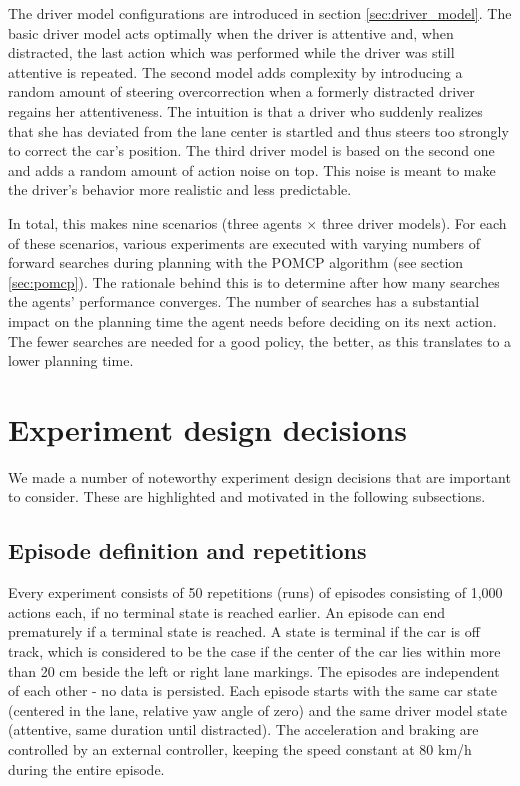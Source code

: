 The driver model configurations are introduced in section \ref{sec:driver_model}. The basic driver model acts optimally when the driver is attentive and, when distracted, the last action which was performed while the driver was still attentive is repeated. The second model adds complexity by introducing a random amount of steering overcorrection when a formerly distracted driver regains her attentiveness. The intuition is that a driver who suddenly realizes that she has deviated from the lane center is startled and thus steers too strongly to correct the car's position. The third driver model is based on the second one and adds a random amount of action noise on top. This noise is meant to make the driver's behavior more realistic and less predictable.

In total, this makes nine scenarios (three agents $\times$ three driver models). For each of these scenarios, various experiments are executed with varying numbers of forward searches during planning with the POMCP algorithm (see section \ref{sec:pomcp}). The rationale behind this is to determine after how many searches the agents' performance converges. The number of searches has a substantial impact on the planning time the agent needs before deciding on its next action. The fewer searches are needed for a good policy, the better, as this translates to a lower planning time.

\section{Experiment design decisions}
\label{sec:design_decisions}
We made a number of noteworthy experiment design decisions that are important to consider. These are highlighted and motivated in the following subsections.

\subsection{Episode definition and repetitions}

Every experiment consists of 50 repetitions (runs) of episodes consisting of 1,000 actions each, if no terminal state is reached earlier. An episode can end prematurely if a terminal state is reached. A state is terminal if the car is off track, which is considered to be the case if the center of the car lies within more than 20 cm beside the left or right lane markings. The episodes are independent of each other - no data is persisted. Each episode starts with the same car state (centered in the lane, relative yaw angle of zero) and the same driver model state (attentive, same duration until distracted). The acceleration and braking are controlled by an external controller, keeping the speed constant at 80 km/h during the entire episode.

